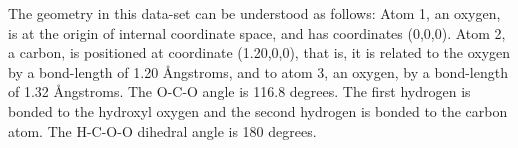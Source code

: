 The geometry in this data-set can be understood as follows: Atom 1, an oxygen,
is at the origin of internal coordinate space, and has  coordinates (0,0,0).
Atom 2, a carbon, is positioned at coordinate  (1.20,0,0), that is, it is
related to the oxygen  by  a  bond-length  of  1.20 \AA ngstroms,  and to atom
3, an oxygen, by a bond-length of 1.32 \AA ngstroms. The O-C-O angle is 116.8
degrees.  The first hydrogen is  bonded  to  the hydroxyl  oxygen  and  the
second hydrogen is bonded to the carbon atom. The H-C-O-O dihedral angle is 180
degrees.
